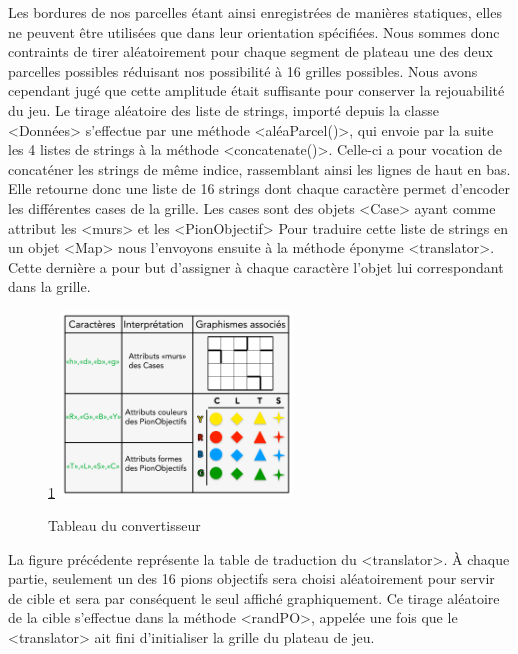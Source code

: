 \documentclass{rapportECL}
\begin{document}
Les bordures de nos parcelles étant ainsi enregistrées de manières statiques, elles ne peuvent être utilisées que dans leur orientation spécifiées. Nous sommes donc contraints de tirer aléatoirement pour chaque segment de plateau une des deux parcelles possibles réduisant nos possibilité à 16 grilles possibles. Nous avons cependant jugé que cette amplitude était suffisante pour conserver la rejouabilité du jeu.
\newline
\newline
Le tirage aléatoire des liste de strings, importé depuis la classe <Données> s'effectue par une méthode <aléaParcel()>, qui envoie par la suite les 4 listes de strings à la méthode <concatenate()>. Celle-ci a pour vocation de concaténer les strings de même indice, rassemblant ainsi les lignes de haut en bas. Elle retourne donc une liste de 16 strings dont chaque caractère permet d'encoder les différentes cases de la grille. Les cases sont des objets <Case> ayant comme attribut les <murs> et les <PionObjectif>
\newpage
Pour traduire cette liste de strings en un objet <Map> nous l'envoyons ensuite à la méthode éponyme <translator>. Cette dernière a pour but d'assigner à chaque caractère l'objet lui correspondant dans la grille.
\newline
 \begin{figure}[h]
    \centering
    \ref{Fig3} 
    \includegraphics[width=0.55\textwidth]{Graphique/Tableau_Traduction.png}
    \caption{Tableau du convertisseur}
    \label{Fig3}
\end{figure}

La figure précédente représente la table de traduction du <translator>. À chaque partie, seulement un des 16 pions objectifs sera choisi aléatoirement pour servir de cible et sera par conséquent le seul affiché graphiquement. Ce tirage aléatoire de la cible s'effectue dans la méthode <randPO>, appelée une fois que le <translator> ait fini d'initialiser la grille du plateau de jeu.
\newline
\end{document}
